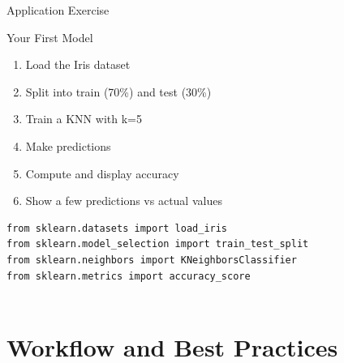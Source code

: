 \documentclass[aspectratio=169]{beamer}
\begin{document}
\begin{frame}[fragile]{Application Exercise}
\begin{block}{Your First Model}
\begin{enumerate}
    \item Load the Iris dataset
    \item Split into train (70\%) and test (30\%)
    \item Train a KNN with k=5
    \item Make predictions
    \item Compute and display accuracy
    \item Show a few predictions vs actual values
\end{enumerate}
\end{block}

\begin{lstlisting}
from sklearn.datasets import load_iris
from sklearn.model_selection import train_test_split
from sklearn.neighbors import KNeighborsClassifier
from sklearn.metrics import accuracy_score


\end{lstlisting}
\end{frame}

\section{Workflow and Best Practices}
\end{document}
